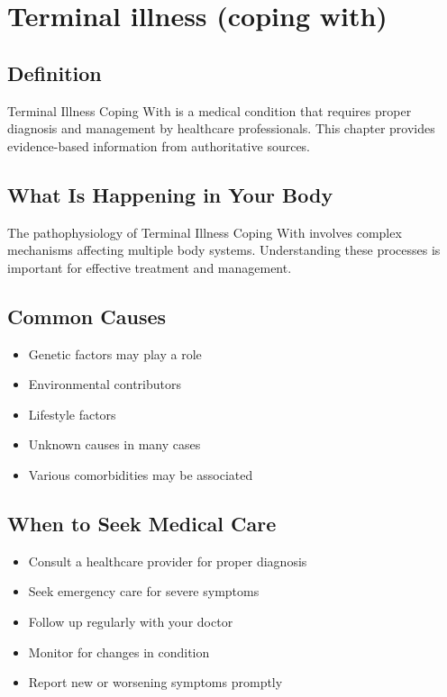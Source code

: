 
\chapter{Terminal illness (coping with)}

\section*{Definition}
Terminal Illness Coping With is a medical condition that requires proper diagnosis and management by healthcare professionals. This chapter provides evidence-based information from authoritative sources.

\section*{What Is Happening in Your Body}
The pathophysiology of Terminal Illness Coping With involves complex mechanisms affecting multiple body systems. Understanding these processes is important for effective treatment and management.

\section*{Common Causes}
\begin{itemize}
  \item Genetic factors may play a role
  \item Environmental contributors
  \item Lifestyle factors
  \item Unknown causes in many cases
  \item Various comorbidities may be associated
\end{itemize}

\section*{When to Seek Medical Care}
\begin{itemize}
  \item Consult a healthcare provider for proper diagnosis
  \item Seek emergency care for severe symptoms
  \item Follow up regularly with your doctor
  \item Monitor for changes in condition
  \item Report new or worsening symptoms promptly
\end{itemize}

